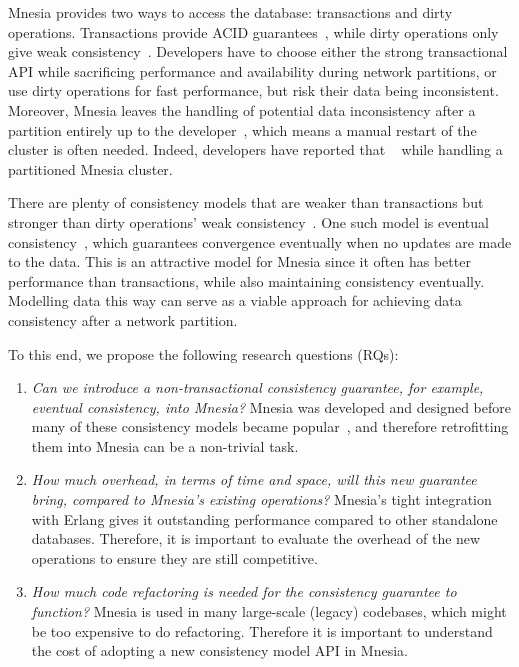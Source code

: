 Mnesia provides two ways to access the database: transactions
and dirty operations. Transactions provide ACID guarantees~\cite{haerder1983dbtransaction}, 
while dirty operations only give weak consistency~\cite{vogels2008ec}. Developers 
have to choose either the
strong transactional API while sacrificing performance and availability during
network partitions, or use dirty operations for fast performance, but risk their
data being inconsistent.  Moreover, Mnesia leaves the handling of potential
data inconsistency after a partition entirely up to the 
developer~\cite{ericssonab2023mnesiaguide}, which means a manual 
restart of the cluster is often needed. Indeed, developers have reported that
~\cite{mineiro2008DukesofErl} 
while handling a partitioned Mnesia cluster. 


There are plenty of consistency models that are weaker than transactions but stronger
than dirty operations' weak consistency~\cite{ericssonab2023mnesiaref}. 
One such model is eventual consistency~\cite{vogels2008ec}, which
guarantees convergence eventually when no updates are made to the data. This is an attractive
model for Mnesia since it often has better performance than transactions, while
also maintaining consistency eventually. Modelling data this way can serve
as a viable approach for achieving data consistency after a network partition.

To this end, we propose the following research questions (RQs):

\begin{enumerate}[label={RQ\arabic*.},ref={RQ\arabic*}]
  \item \emph{Can we introduce a non-transactional consistency guarantee, for example,
  eventual consistency, into Mnesia?} Mnesia was developed and designed before many
  of these consistency models became popular~\cite{mattsson1998mnesia}, and therefore 
  retrofitting them into Mnesia can be a non-trivial task.  \label{itm:question ec possible}
  \item \emph{How much overhead, in terms of time and space, will this new guarantee
  bring, compared to Mnesia's existing operations?} Mnesia's tight integration with
  Erlang gives it outstanding performance compared to other standalone databases.
  Therefore, it is important to evaluate the overhead of the new operations to
  ensure they are still competitive. \label{itm:question ec overhead}
  \item \emph{How much code refactoring is needed for the consistency guarantee to
  function?} Mnesia is used in many large-scale (legacy) codebases, which might
  be too expensive to do refactoring. Therefore it is important to understand 
  the cost of adopting a new consistency model API in Mnesia.  
  \label{itm:question ec refactor}
\end{enumerate}


